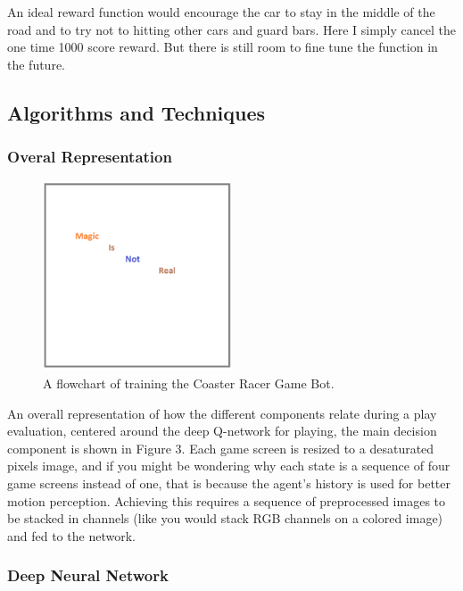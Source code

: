 An ideal reward function would encourage the car to stay in the middle of the road and to try not to hitting other cars and guard bars. Here I simply cancel the one time 1000 score reward. But there is still room to fine tune the function in the future.

\subsection{Algorithms and Techniques}

\subsubsection{Overal Representation}

\begin{figure}[h]
\centering
\includegraphics[width=0.5\textwidth]{figs/magic}
\caption{A flowchart of training the Coaster Racer Game Bot.}
\end{figure}

An overall representation of how the different components relate during a play evaluation, centered around the deep Q-network for playing, the main decision component is shown in Figure 3. Each game screen is resized to a desaturated pixels image, and if you might be wondering why each state is a sequence of four game screens instead of one, that is because the agent's history is used for better motion perception. Achieving this requires a sequence of preprocessed images to be stacked in channels (like you would stack RGB channels on a colored image) and fed to the network.

\subsubsection{Deep Neural Network}

